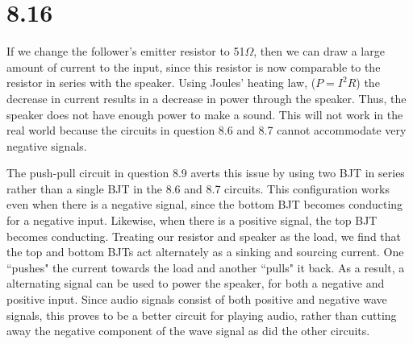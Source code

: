 \documentclass[authoryear, 12pt,5p, times]{elsarticle}
\begin{document}
  \section*{8.16}
\par If we change the follower's emitter resistor to 51$\Omega$, then we can draw a large amount of current to the input, since this resistor is now comparable to the resistor in series with the speaker. Using Joules' heating law, ($P=I^2R$) the decrease in current results in a decrease in power through the speaker. Thus, the speaker does not have enough power to make a sound. This will not work in the real world because the circuits in question 8.6 and 8.7 cannot accommodate very negative signals. 
\par The push-pull circuit in question 8.9 averts this issue by using two BJT in series rather than a single BJT in the 8.6 and 8.7 circuits. This configuration works even when there is a negative signal, since the bottom BJT becomes conducting for a negative input. Likewise, when there is a positive signal, the top BJT becomes conducting. Treating our resistor and speaker as the load, we find that the top and bottom BJTs act alternately as a sinking and sourcing current. One ``pushes" the current towards the load and another ``pulls" it back. As a result, a alternating signal can be used to power the speaker, for both a negative and positive input. Since audio signals consist of both positive and negative wave signals, this proves to be a better circuit for playing audio, rather than cutting away the negative component of the wave signal as did the other circuits.
\end{document}
